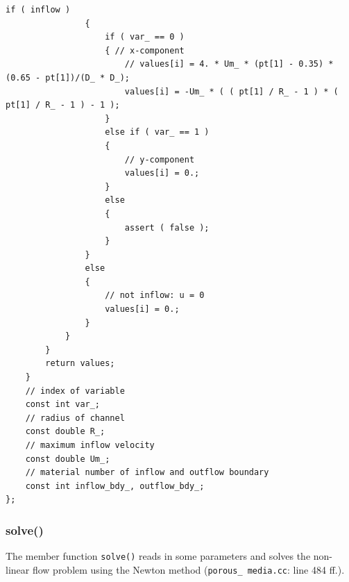 \documentclass{article}
\begin{document}
\begin{lstlisting}[firstnumber=61]
                if ( inflow )
                {
                    if ( var_ == 0 )
                    { // x-component
                        // values[i] = 4. * Um_ * (pt[1] - 0.35) * (0.65 - pt[1])/(D_ * D_);
                        values[i] = -Um_ * ( ( pt[1] / R_ - 1 ) * ( pt[1] / R_ - 1 ) - 1 );
                    }
                    else if ( var_ == 1 )
                    {
                        // y-component
                        values[i] = 0.;
                    }
                    else
                    {
                        assert ( false );
                    }
                }
                else
                {
                    // not inflow: u = 0
                    values[i] = 0.;
                }
            }
        }
        return values;
    }
    // index of variable
    const int var_;
    // radius of channel
    const double R_;
    // maximum inflow velocity
    const double Um_;
    // material number of inflow and outflow boundary
    const int inflow_bdy_, outflow_bdy_;
};
\end{lstlisting}


\subsubsection{solve()}

The member function \texttt{solve()} reads in some parameters and solves the non-linear flow problem using the Newton method (\texttt{porous\_ media.cc}: line 484 ff.).
\end{document}
